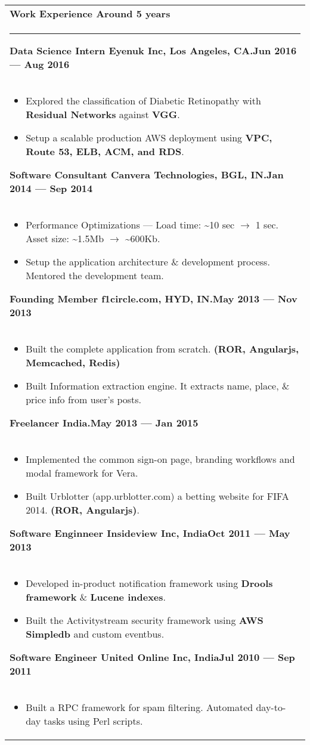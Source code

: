 \documentclass{article}
\begin{document}
\begin{tabular}{p{\dimexpr\linewidth-2\tabcolsep}}
	\bfseries \large{Work Experience} \hfill Around 5 years \\
	\noindent\rule{\textwidth}{0.4pt}
	{\bfseries Data Science Intern \hfill Eyenuk Inc, Los Angeles, CA\@.\hfill Jun 2016 --- Aug 2016} \\
	\begin{itemize}
		\item Explored the classification of Diabetic Retinopathy with \textbf{Residual Networks} against \textbf{VGG}.
		\item Setup a scalable production AWS deployment using \textbf{VPC, Route 53, ELB, ACM, and RDS}\@.
	\end{itemize}

	\bigskip
	{\bfseries Software Consultant \hfill Canvera Technologies, BGL, IN\@.\hfill Jan 2014 --- Sep 2014} \\
	\begin{itemize}
		\item Performance Optimizations --- Load time: \textasciitilde10 sec \( \rightarrow \) 1 sec. Asset size: \textasciitilde1.5Mb \( \rightarrow \) \textasciitilde600Kb.
		\item Setup the application architecture \& development process. Mentored the development team.
	\end{itemize}
	\bigskip 
	{\bfseries Founding Member \hfill f1circle.com, HYD, IN\@.\hfill May 2013 --- Nov 2013} \\
	\begin{itemize}
		\item Built the complete application from scratch. \textbf{(ROR, Angularjs, Memcached, Redis)}
		\item Built Information extraction engine. It extracts name, place, \& price info from user's posts.
	\end{itemize}
	\bigskip
	{\bfseries Freelancer \hfill India.\hfill May 2013 --- Jan 2015} \\
	\begin{itemize}
		\item Implemented the common sign-on page, branding workflows and modal framework for Vera.
		\item Built Urblotter (app.urblotter.com) a betting website for FIFA 2014. \textbf{(ROR, Angularjs)}.
	\end{itemize}
	\bigskip
	{\bfseries Software Enginneer \hfill Insideview Inc, India\hfill Oct 2011 --- May 2013} \\
	\begin{itemize}
		\item Developed in-product notification framework using \textbf{Drools framework} \& \textbf{Lucene indexes}.
		\item Built the Activitystream security framework using \textbf{AWS Simpledb} and custom eventbus.
	\end{itemize}

	\bigskip
	{\bfseries Software Engineer \hfill United Online Inc, India\hfill Jul 2010 --- Sep 2011} \\
	\begin{itemize}
		\item Built a RPC framework for spam filtering.  Automated day-to-day tasks using Perl scripts.
	\end{itemize}

\end{tabular}
\end{document}
